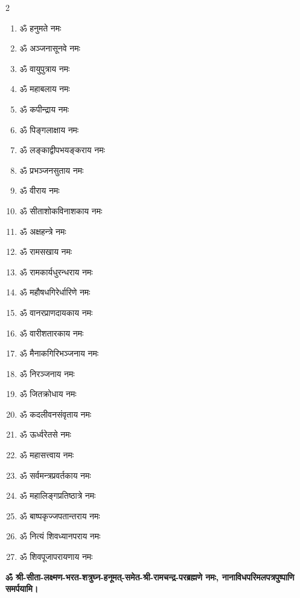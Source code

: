 \begin{center}

\begin{multicols}{2}
\begin{enumerate}
\item ॐ हनुमते नमः
\item ॐ अञ्जनासूनवे नमः
\item ॐ वायुपुत्राय नमः
\item ॐ महाबलाय नमः
\item ॐ कपीन्द्राय नमः
\item ॐ पिङ्गलाक्षाय नमः
\item ॐ लङ्काद्वीपभयङ्कराय नमः
\item ॐ प्रभञ्जनसुताय नमः
\item ॐ वीराय नमः
\item ॐ सीताशोकविनाशकाय नमः
\item ॐ अक्षहन्त्रे नमः
\item ॐ रामसखाय नमः
\item ॐ रामकार्यधुरन्धराय नमः
\item ॐ महौषधगिरेर्धारिणे नमः
\item ॐ वानरप्राणदायकाय नमः
\item ॐ वारीशतारकाय नमः
\item ॐ मैनाकगिरिभञ्जनाय नमः
\item ॐ निरञ्जनाय नमः
\item ॐ जितक्रोधाय नमः
\item ॐ कदलीवनसंवृताय नमः
\item ॐ ऊर्ध्वरेतसे नमः
\item ॐ महासत्त्वाय नमः
\item ॐ सर्वमन्त्रप्रवर्तकाय नमः
\item ॐ महालिङ्गप्रतिष्ठात्रे नमः
\item ॐ बाष्पकृज्जपतान्तराय नमः
\item ॐ नित्यं शिवध्यानपराय नमः
\item ॐ शिवपूजापरायणाय नमः
\end{enumerate}
\end{multicols}

\textbf{ॐ श्री-सीता-लक्ष्मण-भरत-शत्रुघ्न-हनूमत्-समेत-श्री-रामचन्द्र-परब्रह्मणे नमः, नानाविधपरिमलपत्रपुष्पाणि समर्पयामि।} \medskip

\newcommand{\swamine}{श्री~महागणपतये~नमः~श्री~छाया-सुवर्चलाम्बा-समेत\-श्री~सूर्यनारायण-परब्रह्मणे~नमः लक्ष्मी-नारायणाय नमः श्री-महालक्ष्मी-समेत-श्री-सन्तानगोपाल-स्वामिने नमः श्री-साम्बपरमेश्वराय नमः नन्दिकेश्वराय नमः श्री~वल्लीदेवसेनासमेत-श्री-सुब्रह्मण्यस्वामिने नमः श्री~सीता-लक्ष्मण-भरत-शत्रुघ्न-हनूमत्-समेत-श्री-रामचन्द्र परब्रह्मणे नमः,}


\end{center}
